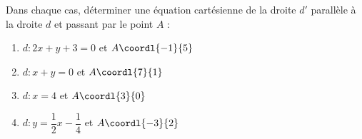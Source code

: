 \begin{exo}{}
	Dans chaque cas, déterminer une équation cartésienne de la droite $d'$ parallèle à la droite $d$ et passant par le point $A$ :
	\begin{enumerate}
		\item $d : 2x + y + 3 = 0$ et $A\coordl{-1}{5}$
		\item $d : x + y = 0$ et $A\coordl{7}{1}$
		\item $d : x = 4$ et $A\coordl{3}{0}$
		\item $d : y = \dfrac{1}{2}x - \dfrac{1}{4}$ et $A\coordl{-3}{2}$
	\end{enumerate}
\end{exo}
